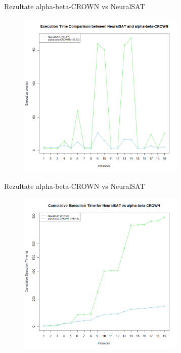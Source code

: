 \begin{frame}{Rezultate alpha-beta-CROWN vs NeuralSAT}
    \begin{figure}[ht]
    \centering
    {\includegraphics[width=8cm]{images/interpretare/Exec_time_comparison.png}}
    \label{rezultateNeuralSat}
    \end{figure}
\end{frame}

\begin{frame}{Rezultate alpha-beta-CROWN vs NeuralSAT}
    \begin{figure}[ht]
    \centering
    {\includegraphics[width=8cm]{images/interpretare/cumulative_NeuralSAT_vs_abC.png}}
    \label{rezultateNeuralSat}
    \end{figure}
\end{frame}

